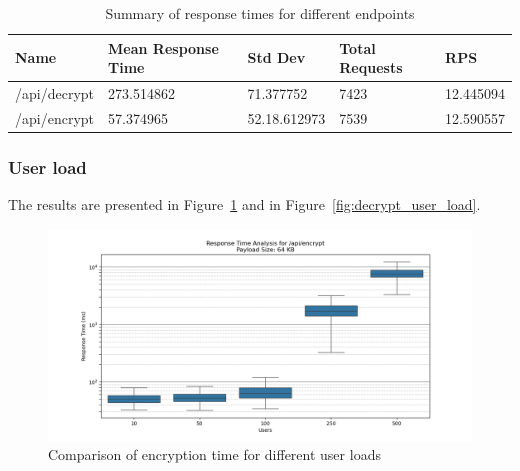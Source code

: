 \documentclass[cic,tc,english]{iiufrgs}
\begin{document}
                \begin{table}[!ht]
                    \centering
                    \begin{tabular}{|l|l|l|l|l|}
                    \hline
                        Name & Mean Response Time &  Std Dev & Total Requests & RPS \\ \hline
                        /api/decrypt & 273.514862 & 71.377752 & 7423 & 12.445094 \\ \hline
                        /api/encrypt & 57.374965 & 52.18.612973 & 7539 & 12.590557 \\ \hline
                    \end{tabular}
                    \caption{Summary of response times for different endpoints}
                    \label{tab:response_times}
                \end{table}

            \subsubsection{User load}
                The results are presented in Figure~\ref{fig:encrypt_user_load} and in Figure~\ref{fig:decrypt_user_load}.

                \begin{figure}
                    \centering
                    \includegraphics[width=\textwidth]{images/phase3/response_time_api_encrypt_64KB.png}
                    \caption{Comparison of encryption time for different user loads}
                    \label{fig:encrypt_user_load}
                \end{figure}
\end{document}
